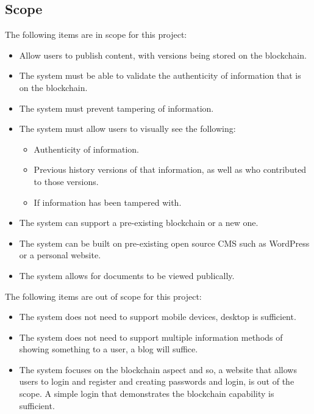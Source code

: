 \subsection{Scope}

The following items are in scope for this project:
\begin{itemize}
	\item Allow users to publish content, with versions being stored on the blockchain.
	\item The system must be able to validate the authenticity of information that is on the blockchain.
	\item The system must prevent tampering of information.
	\item The system must allow users to visually see the following:
	\begin{itemize}
		\item Authenticity of information.
		\item Previous history versions of that information, as well as who contributed to those versions.
		\item If information has been tampered with.
	\end{itemize}
	\item The system can support a pre-existing blockchain or a new one.
	\item The system can be built on pre-existing open source CMS such as WordPress or a personal website. 
	\item The system allows for documents to be viewed publically.
\end{itemize}
The following items are out of scope for this project:
\begin{itemize}
	\item The system does not need to support mobile devices, desktop is sufficient.
	\item The system does not need to support multiple information methods of showing something to a user,
		  a blog will suffice.
	\item The system focuses on the blockchain aspect and so, a website that allows users to login and register
		  and creating passwords and login, is out of the scope. A simple login that demonstrates the blockchain 
		  capability is sufficient.
\end{itemize}
